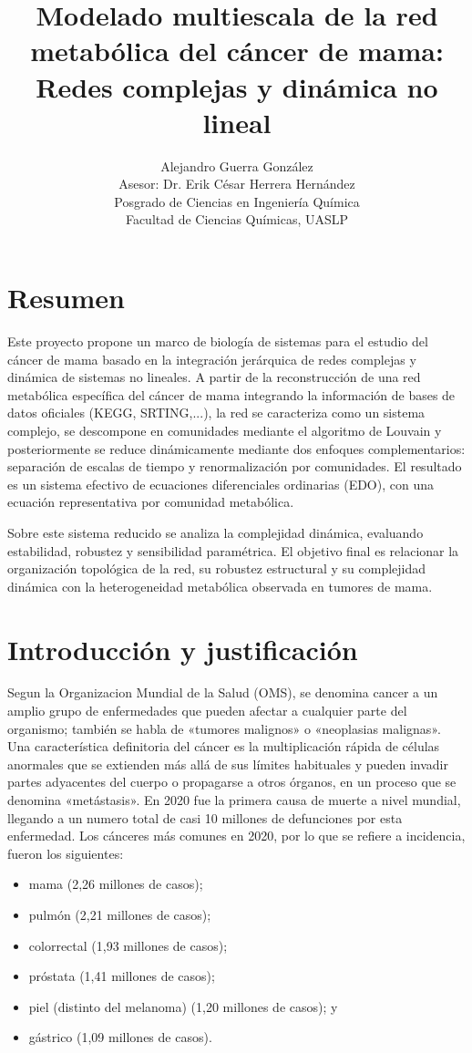 \documentclass[12pt,spanish]{article}
\title{\textbf{Modelado multiescala de la red metabólica del cáncer de mama:}\\
	Redes complejas y dinámica no lineal}
\author{Alejandro Guerra González\\
	Asesor: Dr. Erik César Herrera Hernández\\
	Posgrado de Ciencias en Ingeniería Química \\
	Facultad de Ciencias Químicas, UASLP}
\date{}
\begin{document}
	\maketitle
	
	\section{Resumen}
	
	Este proyecto propone un marco de biología de sistemas para el estudio del cáncer de mama basado en la integración jerárquica de redes complejas y dinámica de sistemas no lineales. A partir de la reconstrucción de una red metabólica específica del cáncer de mama integrando la información de bases de datos oficiales (KEGG, SRTING,...), la red se caracteriza como un sistema complejo, se descompone en comunidades mediante el algoritmo de Louvain y posteriormente se reduce dinámicamente mediante dos enfoques complementarios: separación de escalas de tiempo y renormalización por comunidades. El resultado es un sistema efectivo de ecuaciones diferenciales ordinarias (EDO), con una ecuación representativa por comunidad metabólica.
	
	Sobre este sistema reducido se analiza la complejidad dinámica, evaluando estabilidad, robustez y sensibilidad paramétrica. El objetivo final es relacionar la organización topológica de la red, su robustez estructural y su complejidad dinámica con la heterogeneidad metabólica observada en tumores de mama.
	
	\section{Introducción y justificación}
	
	Segun la Organizacion Mundial de la Salud (OMS), se denomina cancer a un amplio grupo de enfermedades que pueden afectar a cualquier parte del organismo; también se habla de «tumores malignos» o «neoplasias malignas». Una característica definitoria del cáncer es la multiplicación rápida de células anormales que se extienden más allá de sus límites habituales y pueden invadir partes adyacentes del cuerpo o propagarse a otros órganos, en un proceso que se denomina «metástasis». En 2020 fue la primera causa de muerte a nivel mundial, llegando a un numero total de casi 10 millones de defunciones por esta enfermedad. Los cánceres más comunes en 2020, por lo que se refiere a incidencia, fueron los siguientes:
	
	\begin{itemize}
		\item mama (2,26 millones de casos);
		\item pulmón (2,21 millones de casos);
		\item colorrectal (1,93 millones de casos);
		\item próstata (1,41 millones de casos);
		\item piel (distinto del melanoma) (1,20 millones de casos); y
		\item gástrico (1,09 millones de casos).
	\end{itemize}
	
\end{document}
